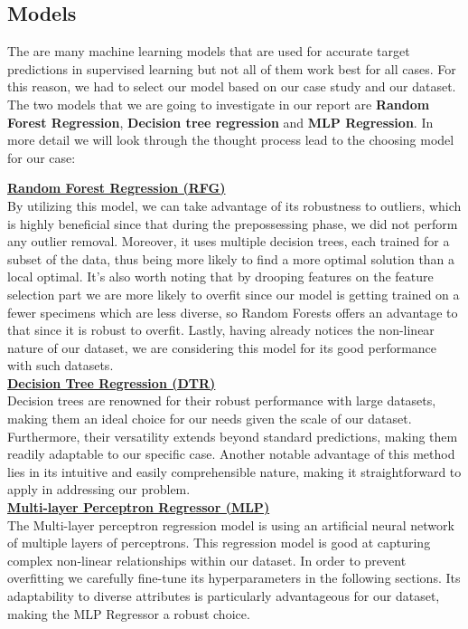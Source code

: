 \documentclass[12pt]{article}
\begin{document}
\subsection{Models}

The are many machine learning models that are used for accurate target predictions in supervised learning but not all of them work best for all cases. For this reason, we had to select our model based on our case study and our dataset. The two models that we are going to investigate in our report are \textbf{Random Forest Regression}, \textbf{Decision tree regression} and \textbf{MLP Regression}. In more detail we will look through the thought process lead to the choosing model for our case:


\underline{\vspace{0.5em}}

\underline{\textbf{Random Forest Regression (RFG)}}\\
By utilizing this model, we can take advantage of its robustness to outliers, which is highly beneficial since that during the prepossessing phase, we did not perform any outlier removal.
Moreover, it uses multiple decision trees, each trained for a subset of the data, thus being more likely to find a more optimal solution than a local optimal. It's also worth noting that by drooping features on the feature selection part we are more likely to overfit since our model is getting trained on a fewer specimens which are less diverse, so Random Forests offers an advantage to that since it is robust to overfit. Lastly, having already notices the non-linear nature of our dataset, we are considering this model for its good performance with such datasets.\cite{scikit-learn-RandomForestRegressor}\\


\underline{\textbf{Decision Tree Regression (DTR)}}\\
Decision trees are renowned for their robust performance with large datasets, making them an ideal choice for our needs given the scale of our dataset. Furthermore, their versatility extends beyond standard predictions, making them readily adaptable to our specific case. Another notable advantage of this method lies in its intuitive and easily comprehensible nature, making it straightforward to apply in addressing our problem.\cite{scikit-learn-DecisionTreeRegressor}\\


\underline{\textbf{Multi-layer Perceptron Regressor (MLP)}}\\
The Multi-layer perceptron regression model is using an artificial neural network of multiple layers of perceptrons. This regression model is good at capturing complex non-linear relationships within our dataset. In order to prevent overfitting we carefully fine-tune its hyperparameters in the following sections. Its adaptability to diverse attributes is particularly advantageous for our dataset, making the MLP Regressor a robust choice.\cite{scikit-learn-MLPRegressor}
\end{document}
